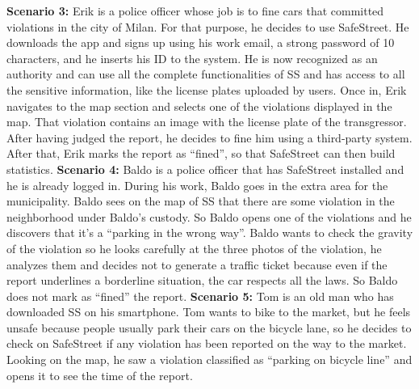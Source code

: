 \documentclass[../RASD.tex]{subfiles}
\begin{document}
                \newline
                \newline
                \textbf{Scenario 3:} Erik is a police officer whose job is to fine cars that committed violations in the city of Milan.
                For that purpose, he decides to use SafeStreet.
                He downloads the app and signs up using his work email, a strong password of 10 characters, and he inserts his ID to the system.
                He is now recognized as an authority and can use all the complete functionalities of SS and has access to all the sensitive information,
                like the license plates uploaded by users.
                Once in, Erik navigates to the map section and selects one of the violations displayed in the map.
                That violation contains an image with the license plate of the transgressor.
                After having judged the report, he decides to fine him using a third-party system.
                After that, Erik marks the report as “fined”, so that SafeStreet can then build statistics.
                \newline
                \newline
                \textbf{Scenario 4:} Baldo is a police officer that has SafeStreet installed and he is already logged in.
                During his work, Baldo goes in the extra area for the municipality.
                Baldo sees on the map of SS that there are some violation in the neighborhood under Baldo’s custody.
                So Baldo opens one of the violations and he discovers that it’s a “parking in the wrong way”.
                Baldo wants to check the gravity of the violation so he looks carefully at the three photos of the violation,
                he analyzes them and decides not to generate a traffic ticket because even if the report underlines a borderline situation,
                the car respects all the laws.
                So Baldo does not mark as “fined” the report.
                \newline
                \newline
                \textbf{Scenario 5:} Tom is an old man who has downloaded SS on his smartphone.
                Tom wants to bike to the market, but he feels unsafe because people usually park their cars on the bicycle lane,
                so he decides to check on SafeStreet if any violation has been reported on the way to the market.
                Looking on the map, he saw a violation classified as “parking on bicycle line” and opens it to see the time of the report.
\end{document}
